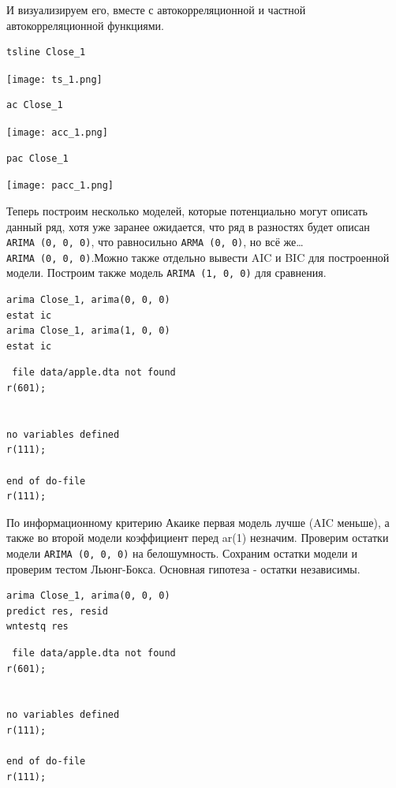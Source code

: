 \documentclass[]{book}
\begin{document}
И визуализируем его, вместе с автокорреляционной и частной автокорреляционной функциями.

\begin{verbatim}
tsline Close_1
\end{verbatim}

\texttt{[image: ts\_1.png]}

\begin{verbatim}
ac Close_1
\end{verbatim}

\texttt{[image: acc\_1.png]}

\begin{verbatim}
pac Close_1
\end{verbatim}

\texttt{[image: pacc\_1.png]}

Теперь построим несколько моделей, которые потенциально могут описать данный ряд, хотя уже заранее ожидается, что ряд в разностях будет описан \texttt{ARIMA\ (0,\ 0,\ 0)}, что равносильно \texttt{ARMA\ (0,\ 0)}, но всё же\ldots{}
\texttt{ARIMA\ (0,\ 0,\ 0)}.Можно также отдельно вывести AIC и BIC для построенной модели. Построим также модель \texttt{ARIMA\ (1,\ 0,\ 0)} для сравнения.

\begin{verbatim}
arima Close_1, arima(0, 0, 0)
estat ic
arima Close_1, arima(1, 0, 0)
estat ic
\end{verbatim}

\begin{verbatim}
 file data/apple.dta not found
r(601);


no variables defined
r(111);

end of do-file
r(111);
\end{verbatim}

По информационному критерию Акаике первая модель лучше (AIC меньше), а также во второй модели коэффициент перед ar(1) незначим.
Проверим остатки модели \texttt{ARIMA\ (0,\ 0,\ 0)} на белошумность. Сохраним остатки модели и проверим тестом Льюнг-Бокса. Основная гипотеза - остатки независимы.

\begin{verbatim}
arima Close_1, arima(0, 0, 0)
predict res, resid
wntestq res
\end{verbatim}

\begin{verbatim}
 file data/apple.dta not found
r(601);


no variables defined
r(111);

end of do-file
r(111);
\end{verbatim}
\end{document}
